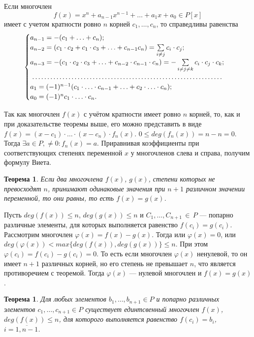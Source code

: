 \begin{873}
	Если многочлен $$f(x) = x^n + a_{n-1}x^{n-1} + \ldots + a_1x + a_0\in P[x]$$ имеет с учетом кратности ровно $n$ корней $c_1, \ldots , c_n$, то справедливы равенства $$
	\begin{cases}
		a_{n-1}=-(c_1+ \ldots + c_n);\\
		a_{n-2}=(c_1 \cdot c_2 + c_1 \cdot c_3 + \ldots + c_{n-1} c_n)=\sum\limits_{i \not= j} c_i \cdot c_j;\\
		a_{n-3}= -(c_1\cdot c_2\cdot c_3 + \ldots + c_{n-2}\cdot c_{n-1}\cdot c_n) = -\sum\limits_{i \not= j \not= k} c_i \cdot c_j \cdot c_k;\\
		\dotfill\\
		a_1 = (-1)^{n-1}(c_1\cdot \ldots \cdot c_{n-1} + \ldots + c_2 \cdot \ldots \cdot c_n);\\
		a_0=(-1)^{n} c_1 \cdot \ldots \cdot c_n.
	\end{cases}$$
\end{873}
\begin{Proof}
	Так как многочлен $f(x)$ с учётом кратности имеет ровно $n$ корней, то, как и при доказательстве теоремы выше, его 
	можно представить в виде $f(x) = (x - c_1)\cdot \ldots \cdot (x - c_n) \cdot f_n(x)$. $0 \leqslant deg(f_n(x)) = n - n = 0$. Тогда $\exists a\in P,\ne 0:	f_n(x) = a$. Приравнивая коэффициенты при соответствующих степенях переменной $x$ у многочленов 
	слева и справа, получим формулу Виета. 
\end{Proof}
\newtheorem*{874}{Теорема}
\begin{874}
	Если два многочлена $f(x)$, $g(x)$, степени которых не превосходят $n$, принимают 
	одинаковые значения при $n+1$ различном значении переменной, то они равны, то есть $f(x) = g(x)$.
\end{874}
\begin{Proof}
	Пусть $deg(f(x))\leqslant n$, $deg (g(x))\leqslant n$ и $C_1, \ldots , C_{n+1} \, \in \, P$ --- попарно различные элементы, для которых выполняется равенство $f(c_i) = g(c_i)$.\\
	Рассмотрим многочлен $\varphi(x) = f(x) - g(x)$. Тогда или $\varphi(x) = 0$, или $deg(\varphi(x)) < max\{deg(f(x)), deg(g(x))\} \leqslant n$. При этом $\varphi(c_i) = f(c_i) - 
	g(c_i) = 0$. То есть если многочлен $\varphi(x)$ ненулевой, то он имеет $n+1$ различных корней, но его степень не превышает 
	$n$, что является противоречием с теоремой. Тогда $\varphi(x)$ --- нулевой многочлен и $f(x) = g(x)$. 
\end{Proof}
\newtheorem*{875}{Теорема}
\begin{875}
	Для любых элементов $b_1,\ldots,b_{n+1} \in P$ и попарно различных элементов $c_1, \ldots, c_{n+1} \in P$ существует единтсвенный многочлен $f(x)$, $deg(f(x)) \leqslant n$, для которого 
	выполняется равенство $f(c_i) = b_i$, $i=\overline{1,n-1}$. 
\end{875}
